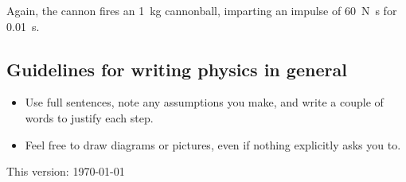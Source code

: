 \documentclass[answers]{exam}
\begin{document}
\begin{questions}
            Again, the cannon fires an \SI{1}{\kilo\gram} cannonball, imparting an impulse of \SI{60}{\newton\second}
            for \SI{0.01}{\second}.
\end{questions}

\subsection*{Guidelines for writing physics in general}
\begin{itemize}
  \item Use full sentences, note any assumptions you make, and write a couple of words to justify each step.
  \item Feel free to draw diagrams or pictures, even if nothing explicitly asks you to.
\end{itemize}

\vspace*{\fill}
This version: \today
\end{document}
